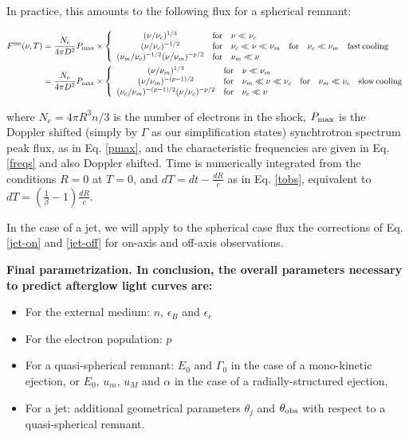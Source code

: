 In practice, this amounts to the following flux for a spherical remnant:

\begin{align}\label{flux}
F^{\rm{iso}}(\nu, T) &= \frac{N_e}{4\pi D^2} P_{\rm{max}} \times \left\{ \begin{array}{clllll}
                                    (\nu/\nu_c)^{1/3} & \rm{for} & \nu \ll \nu_c & & & \\
                                    (\nu/\nu_c)^{-1/2} & \rm{for} & \nu_c \ll \nu \ll \nu_m & \rm{for} & \nu_c \ll \nu_m & \rm{fast\,cooling} \\
                                    (\nu_m/\nu_c)^{-1/2}(\nu/\nu_m)^{-p/2} & \rm{for} & \nu_m \ll \nu & & & \\
                                    \end{array}\right. \\
                   &= \frac{N_e}{4\pi D^2} P_{\rm{max}} \times \left\{ \begin{array}{clllll}
                                    (\nu/\nu_m)^{1/3} & \rm{for} & \nu \ll \nu_m & & &\\
                                    (\nu/\nu_m)^{-(p-1)/2} & \rm{for} & \nu_m \ll \nu \ll \nu_c & \rm{for} & \nu_m \ll \nu_c &\rm{slow\,cooling} \\
                                    (\nu_c/\nu_m)^{-(p-1)/2}(\nu/\nu_c)^{-p/2} & \rm{for} & \nu_c \ll \nu & & & \\
                                    \end{array}\right.
\end{align}

where $N_e = 4 \pi R^3 n / 3$ is the number of electrons in the shock, $P_\rm{max}$ is the Doppler shifted (simply by $\Gamma$ as our simplification states) synchtrotron spectrum peak flux, as in Eq. \ref{pmax}, and the characteristic frequencies are given in Eq. \ref{freqs} and also Doppler shifted. Time is numerically integrated from the conditions $R = 0$ at $T = 0$, and $dT = dt - \frac{dR}{c}$ as in Eq. \ref{tobs}, equivalent to $dT = \left( \frac{1}{\beta} - 1\right)\frac{dR}{c}$.

In the case of a jet, we will apply to the spherical case flux the corrections of Eq. \ref{jet-on} and \ref{jet-off} for on-axis and off-axis observations.

\bf{Final parametrization. }In conclusion, the overall parameters necessary to predict afterglow light curves are:

\begin{itemize}
	\item For the external medium: $n$, $\epsilon_B$ and $\epsilon_e$
    \item For the electron population: $p$
	\item For a quasi-spherical remnant: $E_0$ and $\Gamma_0$ in the case of a mono-kinetic ejection, or $E_0$, $u_m$, $u_M$ and $\alpha$ in the case of a radially-structured ejection,
	\item For a jet: additional geometrical parameters $\theta_j$ and $\theta_{\rm{obs}}$ with respect to a quasi-spherical remnant.
\end{itemize}


